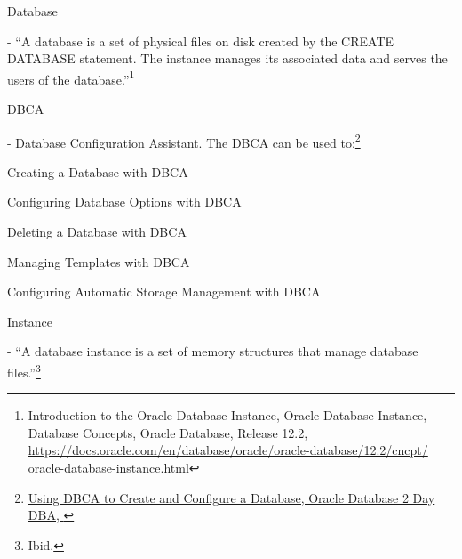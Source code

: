 \begin{itemize*}
\item{\begin{bf}Database\end{bf}} - ``A database is a set of physical
  files on disk created by the CREATE DATABASE statement. The instance
  manages its associated data and serves the users of the database.''\footnote{Introduction to the Oracle Database Instance, Oracle Database Instance, Database Concepts, Oracle Database,
    Release 12.2,
    \href{https://docs.oracle.com/en/database/oracle/oracle-database/12.2/cncpt/oracle-database-instance.html}{https://docs.oracle.com/en/database/oracle/oracle-database/12.2/cncpt/}\newline
  \href{http://www.google.com}{oracle-database-instance.html}}

\item{\begin{bf}DBCA\end{bf}} - Database Configuration Assistant.  The DBCA can be used to:\footnote{\href{https://docs.oracle.com/cd/B16254_01/doc/server.102/b14196/install003.htm}{Using DBCA to Create and Configure a Database, Oracle\textregistered \hspace{1pt} Database 2 Day DBA, }}
\begin{itemize*}
  \item Creating a Database with DBCA
  \item Configuring Database Options with DBCA
  \item Deleting a Database with DBCA
  \item Managing Templates with DBCA
  \item Configuring Automatic Storage Management with DBCA
\end{itemize*}


\item{\begin{bf}Instance\end{bf}} - ``A database instance
  is a set of memory structures that manage database files.''\footnote{Ibid.}
  


\end{itemize*}

